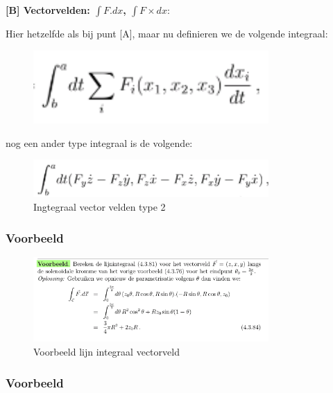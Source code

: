 \documentclass[a4paper]{article}
\begin{document}
\textbf{[B] Vectorvelden: $\int F.dx$, $\int F \times dx$}:

Hier hetzelfde als bij punt [A], maar nu definieren we de volgende integraal:


\begin{figure}[H]
	\centering
	\includegraphics[width=0.8\textwidth]{assets/integraal_vectorvelden.png}
	\caption{}
	\label{fig:integraal_vectorvelden}
\end{figure}

nog een ander type integraal is de volgende:


\begin{figure}[H]
	\centering
	\includegraphics[width=0.8\textwidth]{assets/integraal_vector_velden_cross_product.png}
	\caption{Ingtegraal vector velden type 2}
	\label{fig:integraal_vector_velden_cross_product}
\end{figure}

\subsubsection{Voorbeeld}

\begin{figure}[H]
	\centering
	\includegraphics[width=0.8\textwidth]{assets/voorbeeld_lijn_integraal_vectorveld.png}
	\caption{Voorbeeld lijn integraal vectorveld}
	\label{fig:voorbeeld_lijn_integraal_vectorveld}
\end{figure}


\subsubsection{Voorbeeld}
\end{document}

